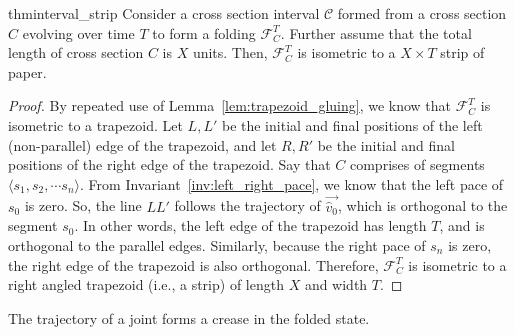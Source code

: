 \begin{restatable}{thm}{interval_strip}
\label{thm:interval_strip}
Consider a cross section interval $\mathcal C$ formed from a cross section $C$ evolving over time $T$ to form a folding $\mathcal F_C^T$.
Further assume that the total length of cross section $C$ is $X$ units. Then, $\mathcal F_C^T$ is isometric to a $X\times T$ strip of paper.
\end{restatable}
\begin{proof}
By repeated use of Lemma~\ref{lem:trapezoid_gluing}, we know that $\mathcal F_C^T$ is isometric to a trapezoid.
Let $L,L'$ be the initial and final positions of the left (non-parallel) edge of the trapezoid, and
let $R,R'$ be the initial and final positions of the right edge of the trapezoid.
Say that $C$ comprises of segments $ \langle s_1, s_2,\cdots s_n \rangle$.
From Invariant~\ref{inv:left_right_pace}, we know that the left pace of $s_0$ is zero.
So, the line $LL'$ follows the trajectory of $\vec{\hat v_0}$, which is orthogonal to the segment $s_0$.
In other words, the left edge of the trapezoid has length $T$, and is orthogonal to the parallel edges.
Similarly, because the right pace of $s_n$ is zero, the right edge of the trapezoid is also orthogonal.
Therefore, $\mathcal F_C^T$ is isometric to a right angled trapezoid (i.e., a strip) of length $X$ and width $T$.
\end{proof}

\begin{remark}
\label{rem:joint_crease}
The trajectory of a joint forms a crease in the folded state.
\end{remark}
